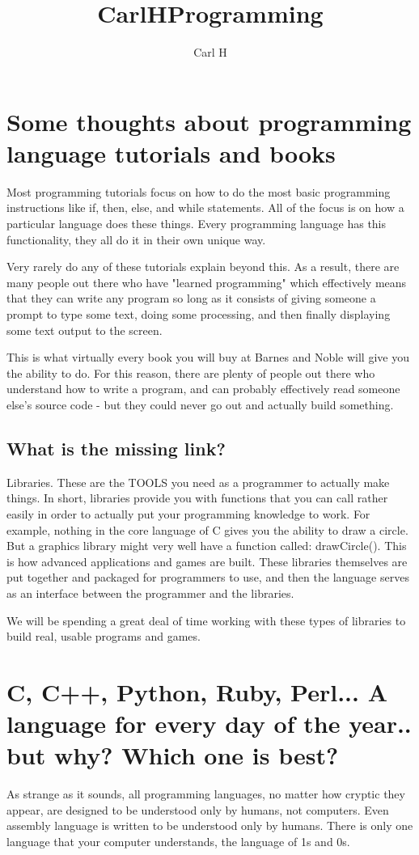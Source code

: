 \documentclass[a4paper,12pt]{article}
\author{Carl H}
\title{CarlHProgramming}
\let\stdsection\section
\renewcommand\section{\newpage\stdsection}
\begin{document}
\setcounter{secnumdepth}{-1}
\tableofcontents
\pagebreak
\section{Some thoughts about programming language tutorials and books}
Most programming tutorials focus on how to do the most basic programming instructions like if, then, else, and while statements. All of the focus is on how a particular language does these things. Every programming language has this functionality, they all do it in their own unique way.

Very rarely do any of these tutorials explain beyond this. As a result, there are many people out there who have "learned programming" which effectively means that they can write any program so long as it consists of giving someone a prompt to type some text, doing some processing, and then finally displaying some text output to the screen.

This is what virtually every book you will buy at Barnes and Noble will give you the ability to do. For this reason, there are plenty of people out there who understand how to write a program, and can probably effectively read someone else's source code - but they could never go out and actually build something.

\subsection{What is the missing link?}

Libraries. These are the TOOLS you need as a programmer to actually make things. In short, libraries provide you with functions that you can call rather easily in order to actually put your programming knowledge to work. For example, nothing in the core language of C gives you the ability to draw a circle. But a graphics library might very well have a function called: drawCircle().
This is how advanced applications and games are built. These libraries themselves are put together and packaged for programmers to use, and then the language serves as an interface between the programmer and the libraries.

We will be spending a great deal of time working with these types of libraries to build real, usable programs and games.
\section{C, C++, Python, Ruby, Perl... A language for every day of the year.. but why? Which one is best?}
As strange as it sounds, all programming languages, no matter how cryptic they appear, are designed to be understood only by humans, not computers. Even assembly language is written to be understood only by humans. There is only one language that your computer understands, the language of 1s and 0s.
\end{document}
